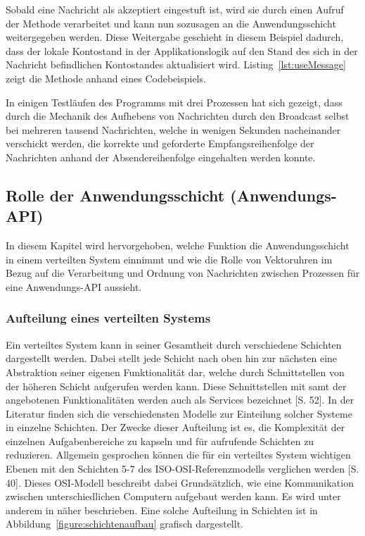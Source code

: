 Sobald eine Nachricht als akzeptiert eingestuft ist, wird sie durch einen Aufruf der Methode  verarbeitet und kann nun sozusagen an die Anwendungsschicht weitergegeben werden. Diese Weitergabe geschieht in diesem Beispiel dadurch, dass der lokale Kontostand in der Applikationslogik auf den Stand des sich in der Nachricht befindlichen Kontostandes aktualisiert wird. Listing~\ref{lst:useMessage} zeigt die Methode anhand eines Codebeispiels.

In einigen Testläufen des Programms mit drei Prozessen hat sich gezeigt, dass durch die Mechanik des Aufhebens von Nachrichten durch den Broadcast selbst bei mehreren tausend Nachrichten, welche in wenigen Sekunden nacheinander verschickt werden, die korrekte und geforderte Empfangsreihenfolge der Nachrichten anhand der Absendereihenfolge eingehalten werden konnte.

\FloatBarrier

\subsection{Rolle der Anwendungsschicht (Anwendungs-API)}
\label{RolleDerAnwendung}
In diesem Kapitel wird hervorgehoben, welche Funktion die Anwendungsschicht in einem verteilten System einnimmt und wie die Rolle von Vektoruhren im Bezug auf die Verarbeitung und Ordnung von Nachrichten zwischen Prozessen für eine Anwendungs-API aussieht.

\subsubsection{Aufteilung eines verteilten Systems}
Ein verteiltes System kann in seiner Gesamtheit durch verschiedene Schichten dargestellt werden. Dabei stellt jede Schicht nach oben hin zur nächsten eine Abstraktion seiner eigenen Funktionalität dar, welche durch Schnittstellen von der höheren Schicht aufgerufen werden kann. Diese Schnittstellen mit samt der angebotenen Funktionalitäten werden auch als Services bezeichnet \cite{Coulouris2011}[S. 52]. In der Literatur finden sich die verschiedensten Modelle zur Einteilung solcher Systeme in einzelne Schichten. Der Zwecke dieser Aufteilung ist es, die Komplexität der einzelnen Aufgabenbereiche zu kapseln und für aufrufende Schichten zu reduzieren. Allgemein gesprochen können die für ein verteiltes System wichtigen Ebenen mit den Schichten 5-7 des ISO-OSI-Referenzmodells verglichen werden \cite{schill12}[S. 40]. Dieses OSI-Modell beschreibt dabei Grundsätzlich, wie eine Kommunikation zwischen unterschiedlichen Computern aufgebaut werden kann. Es wird unter anderem in \cite{ISOOSI} näher beschrieben. Eine solche Aufteilung in Schichten ist in Abbildung~\ref{figure:schichtenaufbau} grafisch dargestellt.

